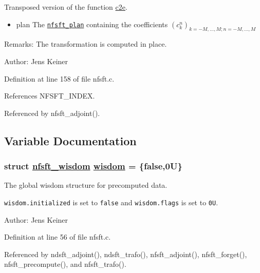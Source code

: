 Transposed version of the function \hyperlink{group__nfsft_ga23}{c2e}. 

\begin{itemize}
\item plan The {\tt \hyperlink{structnfsft__plan}{nfsft\_\-plan}} containing the coefficients $\left(c_k^n\right)_{k=-M,\ldots,M;n=-M,\ldots,M}$\end{itemize}
\begin{Desc}
\item[Remarks:]The transformation is computed in place.\end{Desc}
\begin{Desc}
\item[Author:]Jens Keiner \end{Desc}


Definition at line 158 of file nfsft.c.

References NFSFT\_\-INDEX.

Referenced by nfsft\_\-adjoint().

\subsection{Variable Documentation}
\hypertarget{group__nfsft_ga0}{
\subsubsection[wisdom]{\setlength{\rightskip}{0pt plus 5cm}struct \hyperlink{structnfsft__wisdom}{nfsft\_\-wisdom} \hyperlink{group__nfsft_ga0}{wisdom} = \{false,0U\}}}
\label{group__nfsft_ga0}


The global wisdom structure for precomputed data. 

{\tt wisdom.initialized} is set to {\tt false} and {\tt wisdom.flags} is set to {\tt 0U}.

\begin{Desc}
\item[Author:]Jens Keiner \end{Desc}


Definition at line 56 of file nfsft.c.

Referenced by ndsft\_\-adjoint(), ndsft\_\-trafo(), nfsft\_\-adjoint(), nfsft\_\-forget(), nfsft\_\-precompute(), and nfsft\_\-trafo().